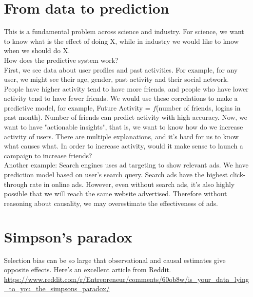 \section{From data to prediction}
This is a fundamental problem across science and industry. For science, we want to know what is the effect of doing X, while in industry we would like to know when we should do X.\\
How does the predictive system work?\\
First, we see data about user profiles and past activities. For example, for any user, we might see their age, gender, past activity and their social network. People have higher activity tend to have more friends, and people who have lower activity tend to have fewer friends. We would use these correlations to make a predictive model, for example,  Future Activity = $f$(number of friends, logins in past month). Number of friends can predict activity with high accuracy. Now, we want to have "actionable insights", that is, we want to know how do we increase activity of users. There are multiple explanations, and it's hard for us to know what causes what. In order to increase activity, would it make sense to launch a campaign to increase friends?\\
Another example: Search engines uses ad targeting to show relevant ads. We have prediction model based on user's search query. Search ads have the highest click-through rate in online ads. However, even without search ads, it's also highly possible that we will reach the same website advertised. Therefore without reasoning about causality, we may overestimate the effectiveness of ads.
\section{Simpson's paradox}
Selection bias can be so large that observational and causal estimates give opposite effects. Here's an excellent article from Reddit.\\
\url{https://www.reddit.com/r/Entrepreneur/comments/60ob8w/is_your_data_lying_to_you_the_simpsons_paradox/}

